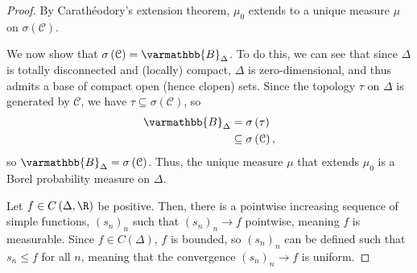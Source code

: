 \documentclass[10pt]{mypackage}
\renewcommand*{\mathbb}[1]{\varmathbb{#1}}
\newcommand{\B}{\mathbb{B}}
\begin{document}
\begin{proof}
  By Carathéodory's extension theorem, $\mu_0$ extends to a unique measure $\mu$ on $\sigma\left(\mathcal{C}\right)$.\newline

  We now show that $\sigma\left(\mathcal{C}\right) = \B_{\Delta}$. To do this, we can see that since $\Delta$ is totally disconnected and (locally) compact, $\Delta$ is zero-dimensional, and thus admits a base of compact open (hence clopen) sets. Since the topology $\tau$ on $\Delta$ is generated by $\mathcal{C}$, we have $\tau\subseteq \sigma\left(\mathcal{C}\right)$, so
  \begin{align*}
    \B_{\Delta} &= \sigma\left(\tau\right)\\
                         &\subseteq \sigma\left(\mathcal{C}\right),
  \end{align*}
  so $\B_{\Delta} = \sigma\left(\mathcal{C}\right)$. Thus, the unique measure $\mu$ that extends $\mu_0$ is a Borel probability measure on $\Delta$.\newline

  Let $f\in C\left(\Delta,\R\right)$ be positive. Then, there is a pointwise increasing sequence of simple functions, $\left(s_n\right)_n$ such that $\left(s_n\right)_n\rightarrow f$ pointwise, meaning $f$ is measurable. Since $f\in C\left(\Delta\right)$, $f$ is bounded, so $\left(s_n\right)_n$ can be defined such that $s_n \leq f$ for all $n$, meaning that the convergence $\left(s_n\right)_n\rightarrow f$ is uniform.\newline


\end{proof}
\end{document}
